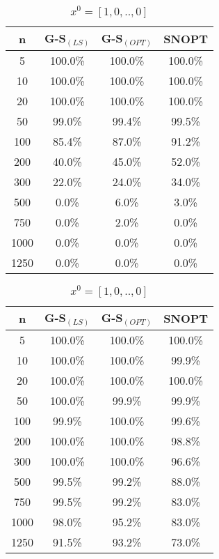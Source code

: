 \begin{table}
\begin{minipage}{.4\linewidth}
\centering
\begin{tabular}{ c | c | c | c }
n &  G-S$_{(LS)}$ & G-S$_{(OPT)}$  & SNOPT \\\hline
5    & 100.0\% & 100.0\% & 100.0\%\\\hline
10   & 100.0\% & 100.0\% & 100.0\%\\\hline
20   & 100.0\% & 100.0\% & 100.0\%\\\hline
50   & 99.0\%  & 99.4\%  & 99.5\%\\\hline
100  & 85.4\%  & 87.0\%  & 91.2\%\\\hline
200  & 40.0\%  & 45.0\%  & 52.0\%\\\hline
300  & 22.0\%  & 24.0\%  & 34.0\%\\\hline
500  & 0.0\%   & 6.0\%   & 3.0\%\\\hline
750  & 0.0\%   & 2.0\%   & 0.0\%\\\hline
1000 & 0.0\%   & 0.0\%   & 0.0\%\\\hline
1250 & 0.0\%   & 0.0\%   & 0.0\%\\\hline
\end{tabular}
\caption{$x^{0}_i = 1/n \quad \forall i$}
\end{minipage}
\hfill
\begin{minipage}{.4\linewidth}
\centering
\begin{tabular}{ c | c| c | c}
n &  G-S$_{(LS)}$ & G-S$_{(OPT)}$  & SNOPT \\\hline
5    & 100.0\%  & 100.0\% & 100.0\%\\\hline
10   & 100.0\%  & 100.0\% & 99.9\%\\\hline
20   & 100.0\%  & 100.0\%  & 100.0\%\\\hline
50   & 100.0\%  & 99.9\%  & 99.9\%\\\hline
100  & 99.9\%   & 100.0\%  & 99.6\% \\\hline
200  & 100.0\%  & 100.0\%  & 98.8\% \\\hline
300  & 100.0\%  & 100.0\%  & 96.6\% \\\hline
500  & 99.5\%   & 99.2\%   & 88.0\%\\\hline
750  & 99.5\%   & 99.2\%  & 83.0\%\\\hline
1000 & 98.0\%   & 95.2\%  & 83.0\%\\\hline
1250 & 91.5\%   & 93.2\%  & 73.0\%\\\hline
\end{tabular}
\caption{$x^{0}= [1, 0, .., 0]$}
\end{minipage}
\end{table}
